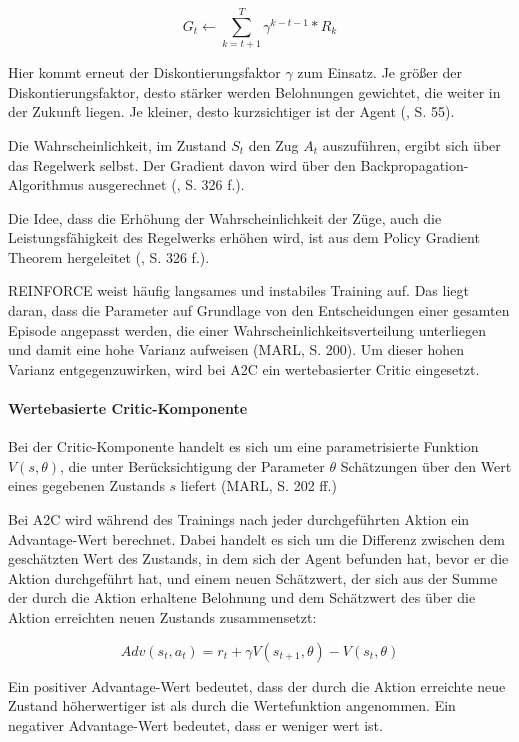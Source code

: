 \[ G_t \leftarrow \sum_{k=t+1}^{T} \gamma ^{k-t-1} * R_k \]

Hier kommt erneut der Diskontierungsfaktor $\gamma$ zum Einsatz. Je größer der Diskontierungsfaktor, desto stärker werden Belohnungen gewichtet, die weiter in der Zukunft liegen. Je kleiner, desto \glqq kurzsichtiger\grqq{} ist der Agent (\cite{Sutton.2018}, S. 55).

Die Wahrscheinlichkeit, im Zustand $S_t$ den Zug $A_t$ auszuführen, ergibt sich über das Regelwerk selbst. Der Gradient davon wird über den Backpropagation-Algorithmus ausgerechnet (\cite{Sutton.2018}, S. 326 f.).

Die Idee, dass die Erhöhung der Wahrscheinlichkeit der Züge, auch die Leistungsfähigkeit des Regelwerks erhöhen wird, ist aus dem Policy Gradient Theorem hergeleitet (\cite{Sutton.2018}, S. 326 f.).

REINFORCE weist häufig langsames und instabiles Training auf. Das liegt daran, dass die Parameter auf Grundlage von den Entscheidungen einer gesamten Episode angepasst werden, die einer Wahrscheinlichkeitsverteilung unterliegen und damit eine hohe Varianz aufweisen (MARL, S. 200). Um dieser hohen Varianz entgegenzuwirken, wird bei A2C ein wertebasierter Critic eingesetzt.

\paragraph{Wertebasierte Critic-Komponente}

Bei der Critic-Komponente handelt es sich um eine parametrisierte Funktion $V(s, \theta)$, die unter Berücksichtigung der Parameter $\theta$ Schätzungen über den Wert eines gegebenen Zustands $s$ liefert (MARL, S. 202 ff.)

Bei A2C wird während des Trainings nach jeder durchgeführten Aktion ein Advantage-Wert berechnet. Dabei handelt es sich um die Differenz zwischen dem geschätzten Wert des Zustands, in dem sich der Agent befunden hat, bevor er die Aktion durchgeführt hat, und einem neuen Schätzwert, der sich aus der Summe der durch die Aktion erhaltene Belohnung und dem Schätzwert des über die Aktion erreichten neuen Zustands zusammensetzt:

\[ Adv(s_t, a_t) = r_t + \gamma V(s_{t+1}, \theta) - V(s_t, \theta) \]

Ein positiver Advantage-Wert bedeutet, dass der durch die Aktion erreichte neue Zustand höherwertiger ist als durch die Wertefunktion angenommen. Ein negativer Advantage-Wert bedeutet, dass er weniger wert ist.

